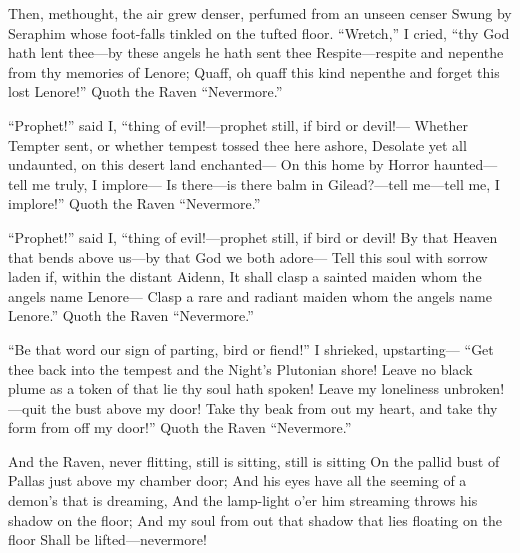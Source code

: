 \documentclass{article}
\begin{document}
    Then, methought, the air grew denser, perfumed from an unseen censer
Swung by Seraphim whose foot-falls tinkled on the tufted floor.
    “Wretch,” I cried, “thy God hath lent thee—by these angels he hath sent thee
    Respite—respite and nepenthe from thy memories of Lenore;
Quaff, oh quaff this kind nepenthe and forget this lost Lenore!”
            Quoth the Raven “Nevermore.”

            ``Prophet!” said I, “thing of evil!—prophet still, if bird or devil!—
Whether Tempter sent, or whether tempest tossed thee here ashore,
    Desolate yet all undaunted, on this desert land enchanted—
    On this home by Horror haunted—tell me truly, I implore—
Is there—is there balm in Gilead?—tell me—tell me, I implore!”
            Quoth the Raven “Nevermore.”

            ``Prophet!” said I, ``thing of evil!—prophet still, if bird or devil!
By that Heaven that bends above us—by that God we both adore—
    Tell this soul with sorrow laden if, within the distant Aidenn,
    It shall clasp a sainted maiden whom the angels name Lenore—
Clasp a rare and radiant maiden whom the angels name Lenore.”
            Quoth the Raven ``Nevermore.”

            ``Be that word our sign of parting, bird or fiend!” I shrieked, upstarting—
            ``Get thee back into the tempest and the Night's Plutonian shore!
    Leave no black plume as a token of that lie thy soul hath spoken!
    Leave my loneliness unbroken!—quit the bust above my door!
Take thy beak from out my heart, and take thy form from off my door!”
            Quoth the Raven “Nevermore.”

    And the Raven, never flitting, still is sitting, still is sitting
On the pallid bust of Pallas just above my chamber door;
    And his eyes have all the seeming of a demon's that is dreaming,
    And the lamp-light o'er him streaming throws his shadow on the floor;
And my soul from out that shadow that lies floating on the floor
            Shall be lifted—nevermore!
\end{document}
